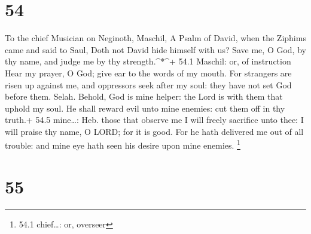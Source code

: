 \hypertarget{section-53}{%
\section{54}\label{section-53}}

To the chief Musician on Neginoth, Maschil, A Psalm of David, when the
Ziphims came and said to Saul, Doth not David hide himself with us?
 Save me, O God, by thy name, and judge me by thy
strength.\^{}*\^{}+ 54.1 Maschil: or, of instruction  Hear
my prayer, O God; give ear to the words of my mouth.  For
strangers are risen up against me, and oppressors seek after my soul:
they have not set God before them. Selah.  Behold, God is
mine helper: the Lord is with them that uphold my soul.  He
shall reward evil unto mine enemies: cut them off in thy truth.+ 54.5
mine\ldots: Heb. those that observe me  I will freely
sacrifice unto thee: I will praise thy name, O LORD; for it is good.
 For he hath delivered me out of all trouble: and mine eye
hath seen his desire upon mine enemies. \footnote{54.1 chief\ldots: or,
  overseer}

\hypertarget{section-54}{%
\section{55}\label{section-54}}

